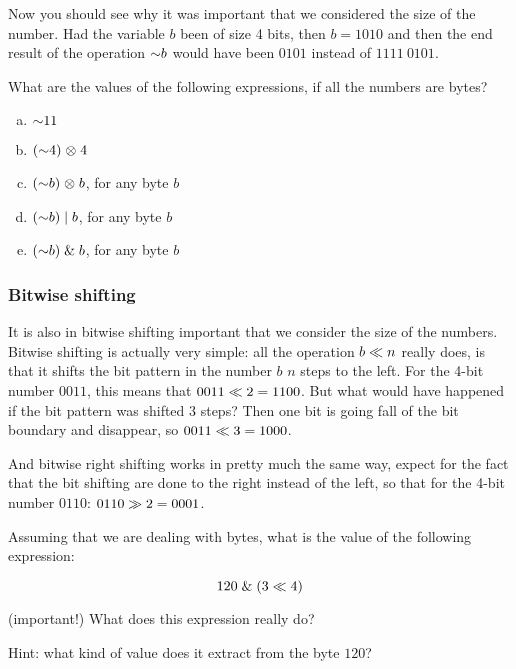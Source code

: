Now you should see why it was important that we considered the size of
the number. Had the variable $b$ been of size 4 bits, then $b = 1010$
and then the end result of the operation $\mathord{\sim} b$ would have been
$0101$ instead of $1111\ 0101$.

\begin{Exercise}[label={bitnot}]
  What are the values of the following expressions, if all the numbers
  are bytes?

  \begin{enumerate}[(a)]
  \item $\mathord{\sim} 11$
  \item $(\mathord{\sim} 4) \mathrel{\otimes} 4$
  \item $(\mathord{\sim} b) \mathrel{\otimes} b$, for any byte $b$
  \item $(\mathord{\sim} b) \mathrel{|} b$, for any byte $b$
  \item $(\mathord{\sim} b) \mathrel{\&} b$, for any byte $b$
  \end{enumerate}

\end{Exercise}

\subsubsection{Bitwise shifting}

It is also in bitwise shifting important that we consider the size of
the numbers. Bitwise shifting is actually very simple: all the
operation $b \ll n$ really does, is that it shifts the bit
pattern in the number $b$ $n$ steps to the left. For the 4-bit number
$0011$, this means that $0011 \ll 2 = 1100$. But what would
have happened if the bit pattern was shifted 3 steps? Then one bit is
going fall of the bit boundary and disappear, so $0011 \ll 3 =
1000$.

And bitwise right shifting works in pretty much the same way, expect
for the fact that the bit shifting are done to the right instead of
the left, so that for the 4-bit number $0110$: $0110 \gg 2 =
0001$.

\begin{Exercise}[label={bit-shiting}]
  Assuming that we are dealing with bytes, what is the value of the
  following expression:

  \begin{equation*}
    120 \mathrel{\&} (3 \ll 4)
  \end{equation*}

  (important!) What does this expression really do?

  Hint: what kind of value does it extract from the byte $120$?

\end{Exercise}

